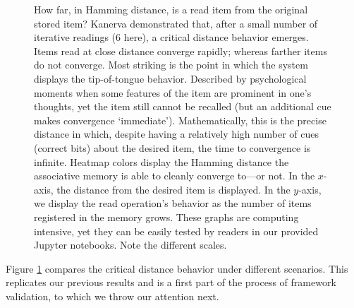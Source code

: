 \begin{figure}[!htb]
\centering


\caption{How far, in Hamming distance, is a read item from the original stored item? Kanerva demonstrated that, after a small number of iterative readings (6 here), a critical distance behavior emerges. Items read at close distance converge rapidly; whereas farther items do not converge. Most striking is the point in which the system displays the tip-of-tongue behavior. Described by psychological moments when some features of the item are prominent in one's thoughts, yet the item still cannot be recalled (but an additional cue makes convergence `immediate'). Mathematically, this is the precise distance in which, despite having a relatively high number of cues (correct bits) about the desired item, the time to convergence is infinite.   Heatmap colors display the Hamming distance the associative memory is able to cleanly converge to---or not.   In the $x$-axis, the distance from the desired item is displayed. In the $y$-axis, we display the read operation's behavior as the number of items registered in the memory grows.  These graphs are computing intensive, yet they can be easily tested by readers in our provided Jupyter notebooks. Note the different scales.}
\label{fig:crit-dist-10k-writes}

\end{figure}

Figure \ref{fig:crit-dist-10k-writes} compares the critical distance behavior under different scenarios.  This replicates our previous results \citep{Brogliato2011, brogliato2014sparse} and is a first part of the process of framework validation, to which we throw our attention next.

